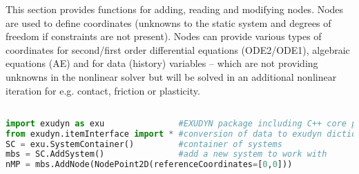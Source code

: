 This section provides functions for adding, reading and modifying nodes. Nodes are used to define coordinates (unknowns to the static system and degrees of freedom if constraints are not present). Nodes can provide various types of coordinates for second/first order differential equations (ODE2/ODE1), algebraic equations (AE) and for data (history) variables -- which are not providing unknowns in the nonlinear solver but will be solved in an additional nonlinear iteration for e.g. contact, friction or plasticity.
\pythonstyle
\begin{lstlisting}[language=Python, firstnumber=1]

import exudyn as exu               #EXUDYN package including C++ core part
from exudyn.itemInterface import * #conversion of data to exudyn dictionaries
SC = exu.SystemContainer()         #container of systems
mbs = SC.AddSystem()               #add a new system to work with
nMP = mbs.AddNode(NodePoint2D(referenceCoordinates=[0,0]))
\end{lstlisting}

